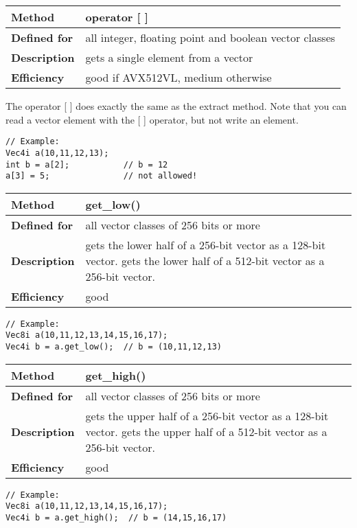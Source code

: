 \documentclass[vcl_manual.tex]{subfiles}
\begin{document}
\begin{tabular}{|p{25mm}|p{100mm}|}
\hline
\bfseries Method & operator [ ] \\ \hline
\bfseries Defined for & all integer, floating point and boolean vector classes \\ \hline
\bfseries Description & gets a single element from a vector \\ \hline
\bfseries Efficiency & good if AVX512VL, medium otherwise \\ \hline
\end{tabular}

The operator [ ] does exactly the same as the extract method. Note that you can read a vector element with the [ ] operator, but not write an element.

\begin{lstlisting}[frame=none]
// Example:
Vec4i a(10,11,12,13);
int b = a[2];           // b = 12
a[3] = 5;               // not allowed!
\end{lstlisting}

\begin{tabular}{|p{25mm}|p{100mm}|}
\hline
\bfseries Method & get\_low() \\ \hline
\bfseries Defined for & all vector classes of 256 bits or more \\ \hline
\bfseries Description & gets the lower half of a 256-bit vector as a 128-bit vector.\newline
gets the lower half of a 512-bit vector as a 256-bit vector.
 \\ \hline
\bfseries Efficiency & good \\ \hline
\end{tabular}
\begin{lstlisting}[frame=none]
// Example:
Vec8i a(10,11,12,13,14,15,16,17);
Vec4i b = a.get_low();  // b = (10,11,12,13)
\end{lstlisting}

\begin{tabular}{|p{25mm}|p{100mm}|}
\hline
\bfseries Method & get\_high() \\ \hline
\bfseries Defined for & all vector classes of 256 bits or more \\ \hline
\bfseries Description & gets the upper half of a 256-bit vector as a 128-bit vector.\newline
gets the upper half of a 512-bit vector as a 256-bit vector.
 \\ \hline
\bfseries Efficiency & good \\ \hline
\end{tabular}
\begin{lstlisting}[frame=none]
// Example:
Vec8i a(10,11,12,13,14,15,16,17);
Vec4i b = a.get_high();  // b = (14,15,16,17)
\end{lstlisting}
\end{document}
